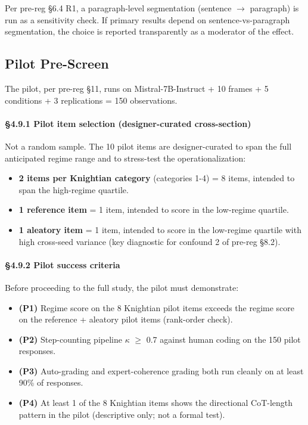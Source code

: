 \documentclass{article}
\providecommand{\tightlist}{\setlength{\itemsep}{0pt}\setlength{\parskip}{0pt}}
\begin{document}
Per pre-reg \S{}6.4 R1, a paragraph-level segmentation (sentence \ensuremath{\rightarrow}
paragraph) is run as a sensitivity check. If primary results depend on
sentence-vs-paragraph segmentation, the choice is reported transparently
as a moderator of the effect.

\subsection{Pilot Pre-Screen}\label{pilot-pre-screen}

The pilot, per pre-reg \S{}11, runs on Mistral-7B-Instruct + 10 frames + 5
conditions + 3 replications = 150 observations.

\paragraph{\S{}4.9.1 Pilot item selection (designer-curated
cross-section)}\label{pilot-item-selection-designer-curated-cross-section}

Not a random sample. The 10 pilot items are designer-curated to span the
full anticipated regime range and to stress-test the operationalization:

\begin{itemize}
\tightlist
\item
  \textbf{2 items per Knightian category} (categories 1-4) = 8 items,
  intended to span the high-regime quartile.
\item
  \textbf{1 reference item} = 1 item, intended to score in the
  low-regime quartile.
\item
  \textbf{1 aleatory item} = 1 item, intended to score in the low-regime
  quartile with high cross-seed variance (key diagnostic for confound 2
  of pre-reg \S{}8.2).
\end{itemize}

\paragraph{\S{}4.9.2 Pilot success criteria}\label{pilot-success-criteria}

Before proceeding to the full study, the pilot must demonstrate:

\begin{itemize}
\tightlist
\item
  \textbf{(P1)} Regime score on the 8 Knightian pilot items exceeds the
  regime score on the reference + aleatory pilot items (rank-order
  check).
\item
  \textbf{(P2)} Step-counting pipeline \ensuremath{\kappa} \ensuremath{\geq} 0.7 against human coding on
  the 150 pilot responses.
\item
  \textbf{(P3)} Auto-grading and expert-coherence grading both run
  cleanly on at least 90\% of responses.
\item
  \textbf{(P4)} At least 1 of the 8 Knightian items shows the
  directional CoT-length pattern in the pilot (descriptive only; not a
  formal test).
\end{itemize}
\end{document}

